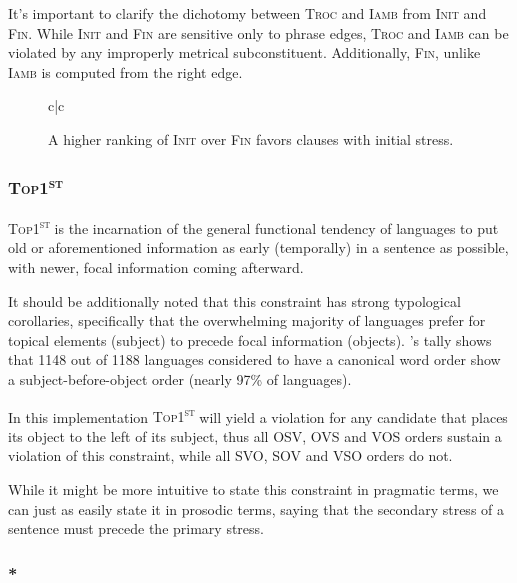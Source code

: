 \documentclass{article}
\newcommand{\iamb}{\textsc{Iamb}}
\newcommand{\topf}{\textsc{Top1\textsuperscript{st}}}
\newcommand{\nophi}{\textsc{*\textphi}}
\newcommand{\finphi}{\textsc{Fin\textphi}}
\newcommand{\initphi}{\textsc{Init\textphi}}
\newcommand{\troc}{\textsc{Troc}}
\begin{document}
It's important to clarify the dichotomy between {\troc} and {\iamb} from {\initphi} and {\finphi}. While {\initphi} and {\finphi} are sensitive only to phrase edges, {\troc} and {\iamb} can be violated by any improperly metrical subconstituent. Additionally, {\finphi}, unlike {\iamb} is computed from the right edge.

\begin{figure}
\begin{center}
\begin{tableau}{c|c}
		\const{\initphi}	\const{\finphi}
	\cand{[S][OV]} \vio{}	\vio{*!}
	\cand{[S][VO]} \vio{*!}	\vio{}
	\cand{[V][SO]}	\vio{*!}	\vio{*}
	\cand[\Optimal]{[SVO]}	\vio{}	\vio{}
\end{tableau}
\end{center}
	\caption{A higher ranking of {\initphi} over {\finphi} favors clauses with initial stress.}
\end{figure}

\subsubsection{\topf}

{\topf} is the incarnation of the general functional tendency of languages to put old or aforementioned information as early (temporally) in a sentence as possible, with newer, focal information coming afterward.


It should be additionally noted that this constraint has strong typological corollaries, specifically that the overwhelming majority of languages prefer for topical elements (subject) to precede focal information (objects).
\textcite{dryer13}'s tally shows that 1148 out of 1188 languages considered to have a canonical word order show a subject-before-object order (nearly 97\% of languages).

In this implementation {\topf} will yield a violation for any candidate that places its object to the left of its subject, thus all OSV, OVS and VOS orders sustain a violation of this constraint, while all SVO, SOV and VSO orders do not.

While it might be more intuitive to state this constraint in pragmatic terms, we can just as easily state it in prosodic terms, saying that the secondary stress of a sentence must precede the primary stress.

\subsubsection{\nophi}
\end{document}
